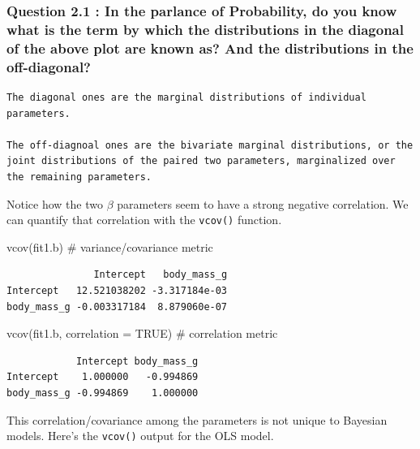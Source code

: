 \documentclass[
  letterpaper,
  DIV=11,
  numbers=noendperiod]{scrartcl}
\newenvironment{Shaded}{\begin{snugshade}}{\end{snugshade}}
\newcommand{\AttributeTok}[1]{\textcolor[rgb]{0.40,0.45,0.13}{#1}}
\newcommand{\CommentTok}[1]{\textcolor[rgb]{0.37,0.37,0.37}{#1}}
\newcommand{\ConstantTok}[1]{\textcolor[rgb]{0.56,0.35,0.01}{#1}}
\newcommand{\FunctionTok}[1]{\textcolor[rgb]{0.28,0.35,0.67}{#1}}
\newcommand{\NormalTok}[1]{\textcolor[rgb]{0.00,0.23,0.31}{#1}}
\begin{document}
\subsubsection{Question 2.1 : In the parlance of Probability, do you
know what is the term by which the distributions in the diagonal of the
above plot are known as? And the distributions in the
off-diagonal?}\label{question-2.1-in-the-parlance-of-probability-do-you-know-what-is-the-term-by-which-the-distributions-in-the-diagonal-of-the-above-plot-are-known-as-and-the-distributions-in-the-off-diagonal}

\begin{verbatim}
The diagonal ones are the marginal distributions of individual parameters.

The off-diagnoal ones are the bivariate marginal distributions, or the joint distributions of the paired two parameters, marginalized over the remaining parameters.
\end{verbatim}

Notice how the two \(\beta\) parameters seem to have a strong negative
correlation. We can quantify that correlation with the \texttt{vcov()}
function.

\begin{Shaded}
\begin{Highlighting}[]
\FunctionTok{vcov}\NormalTok{(fit1.b)                      }\CommentTok{\# variance/covariance metric}
\end{Highlighting}
\end{Shaded}

\begin{verbatim}
               Intercept   body_mass_g
Intercept   12.521038202 -3.317184e-03
body_mass_g -0.003317184  8.879060e-07
\end{verbatim}

\begin{Shaded}
\begin{Highlighting}[]
\FunctionTok{vcov}\NormalTok{(fit1.b, }\AttributeTok{correlation =} \ConstantTok{TRUE}\NormalTok{)  }\CommentTok{\# correlation metric}
\end{Highlighting}
\end{Shaded}

\begin{verbatim}
            Intercept body_mass_g
Intercept    1.000000   -0.994869
body_mass_g -0.994869    1.000000
\end{verbatim}

This correlation/covariance among the parameters is not unique to
Bayesian models. Here's the \texttt{vcov()} output for the OLS model.
\end{document}
